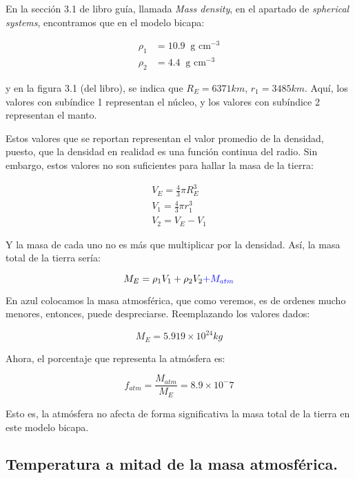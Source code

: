 En la sección 3.1 de libro guía, llamada \textit{Mass density}, en el apartado de \textit{spherical systems}, encontramos que en el modelo bicapa:

\begin{align*}
    \rho_1 &= 10.9 \ \text{ g cm}^{-3} \\
    \rho_2 &= 4.4 \ \text{ g cm}^{-3}
\end{align*}

y en la figura 3.1 (del libro), se indica que $R_E = 6371 km$, $r_1 = 3485 km$. Aquí, los valores con subíndice 1 representan el núcleo, y los valores con subíndice 2 representan el manto.

Estos valores que se reportan representan el valor promedio de la densidad, puesto, que la densidad en realidad es una función continua del radio. Sin embargo, estos valores no son suficientes para hallar la masa de la tierra:

\begin{align*}
    V_E = \frac{4}{3} \pi R_E^3 \\
    V_1 = \frac{4}{3} \pi r_1^3 \\  
    V_2 = V_E - V_1
\end{align*}

Y la masa de cada uno no es más que multiplicar por la densidad. Así, la masa total de la tierra sería:

\begin{equation}
    M_E = \rho_1 V_1 + \rho_2 V_2  \textcolor{blue}{ + M_{atm}}
\end{equation}

En azul colocamos la masa atmosférica, que como veremos, es de ordenes mucho menores, entonces, puede despreciarse. Reemplazando los valores dados:

\begin{equation}
    M_E = 5.919 \times 10^{24} kg
\end{equation}

Ahora, el porcentaje que representa la atmósfera es:

\begin{equation}
    \boxed{
        f_{atm} = \frac{M_{atm}}{M_E} = 8.9 \times  10^-7
    }
\end{equation}

Esto es, la atmósfera no afecta de forma significativa la masa total de la tierra en este modelo bicapa.

\subsection{Temperatura a mitad de la masa atmosférica.}

